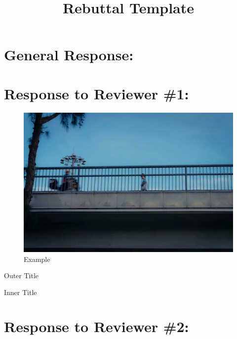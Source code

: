 \documentclass[11pt]{article}
\title{Rebuttal Template}
\date{}
\begin{document}
\maketitle
\onehalfspacing
\section{General Response:}

\lipsum[1]\cite{jiang2023detecting}

\setcounter{CommentCounter}{0} %
\section{Response to Reviewer \#1:}

\reviewercomment{\lipsum[2]}

\begin{response}
\lipsum[3]
\end{response}


\reviewercomment{\lipsum[5]}


\begin{figure}[h]
    \centering
    \includegraphics[width=1\linewidth]{figures/example.jpeg}
    \caption{Example}
    \label{fig:example}
\end{figure}
\begin{response}

    \lipsum[6]
\end{response}

\begin{manuscriptchangeenv}{Outer Title}
    \lipsum[7]
    \begin{manuscriptchangeenv}{Inner Title}
        \lipsum[8]
    \end{manuscriptchangeenv}
\end{manuscriptchangeenv}

\setcounter{CommentCounter}{0} %
\section{Response to Reviewer \#2:}

\reviewercomment{\lipsum[2]}

\begin{response}
\lipsum[3]
\end{response}




\end{document}
